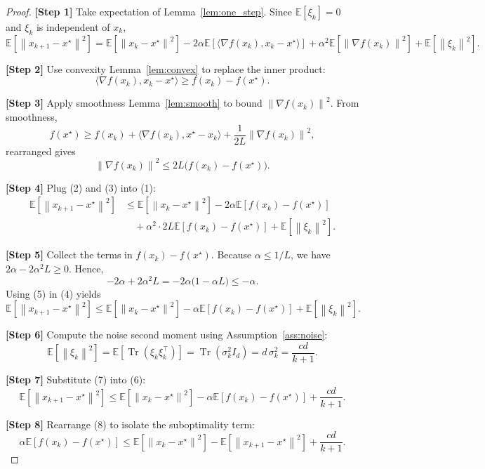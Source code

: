 \documentclass{article}
\newcommand{\E}{\mathbb{E}}
\newcommand{\norm}[1]{\left\lVert #1\right\rVert}
\newcommand{\ip}[2]{\langle #1,#2\rangle}
\begin{document}
\begin{proof}
\textbf{[Step 1]} Take expectation of Lemma~\ref{lem:one_step}. Since $\E[\xi_k]=0$ and $\xi_k$ is independent of $x_k$,
\[
\E\!\left[\norm{x_{k+1}-x^\star}^2\right]
 = \E\!\left[\norm{x_k-x^\star}^2\right]
 -2\alpha\E\!\left[\ip{\nabla f(x_k)}{x_k-x^\star}\right]
 +\alpha^2\E\!\left[\norm{\nabla f(x_k)}^2\right]
 +\E\!\left[\norm{\xi_k}^2\right].
\tag{1}
\]

\textbf{[Step 2]} Use convexity Lemma~\ref{lem:convex} to replace the inner product:
\[
\ip{\nabla f(x_k)}{x_k-x^\star}\ge f(x_k)-f(x^\star).
\tag{2}
\]

\textbf{[Step 3]} Apply smoothness Lemma~\ref{lem:smooth} to bound $\norm{\nabla f(x_k)}^2$.
From smoothness,
\[
f(x^\star)\ge f(x_k)+\ip{\nabla f(x_k)}{x^\star-x_k}+\frac{1}{2L}\norm{\nabla f(x_k)}^2,
\]
rearranged gives
\[
\norm{\nabla f(x_k)}^2\le 2L\bigl(f(x_k)-f(x^\star)\bigr).
\tag{3}
\]

\textbf{[Step 4]} Plug (2) and (3) into (1):
\[
\begin{aligned}
\E\!\left[\norm{x_{k+1}-x^\star}^2\right]
&\le \E\!\left[\norm{x_k-x^\star}^2\right]
 -2\alpha\E\!\left[f(x_k)-f(x^\star)\right] \\
&\quad +\alpha^2\cdot 2L\E\!\left[f(x_k)-f(x^\star)\right]
 +\E\!\left[\norm{\xi_k}^2\right].
\end{aligned}
\tag{4}
\]

\textbf{[Step 5]} Collect the terms in $f(x_k)-f(x^\star)$.
Because $\alpha\le 1/L$, we have $2\alpha-2\alpha^2L\ge 0$. Hence,
\[
-2\alpha +2\alpha^2L = -2\alpha\bigl(1-\alpha L\bigr)\le -\alpha .
\tag{5}
\]
Using (5) in (4) yields
\[
\E\!\left[\norm{x_{k+1}-x^\star}^2\right]
\le \E\!\left[\norm{x_k-x^\star}^2\right]
 -\alpha \E\!\left[f(x_k)-f(x^\star)\right]
 +\E\!\left[\norm{\xi_k}^2\right].
\tag{6}
\]

\textbf{[Step 6]} Compute the noise second moment using Assumption~\ref{ass:noise}:
\[
\E\!\left[\norm{\xi_k}^2\right]=\E\!\left[\operatorname{Tr}(\xi_k\xi_k^\top)\right]
 =\operatorname{Tr}(\sigma_k^2 I_d)=d\,\sigma_k^2
 =\frac{cd}{k+1}.
\tag{7}
\]

\textbf{[Step 7]} Substitute (7) into (6):
\[
\E\!\left[\norm{x_{k+1}-x^\star}^2\right]
\le \E\!\left[\norm{x_k-x^\star}^2\right]
 -\alpha \E\!\left[f(x_k)-f(x^\star)\right]
 +\frac{cd}{k+1}.
\tag{8}
\]

\textbf{[Step 8]} Rearrange (8) to isolate the suboptimality term:
\[
\alpha \E\!\left[f(x_k)-f(x^\star)\right]
\le \E\!\left[\norm{x_k-x^\star}^2\right]
 -\E\!\left[\norm{x_{k+1}-x^\star}^2\right]
 +\frac{cd}{k+1}.
\tag{9}
\]


\end{proof}
\end{document}
